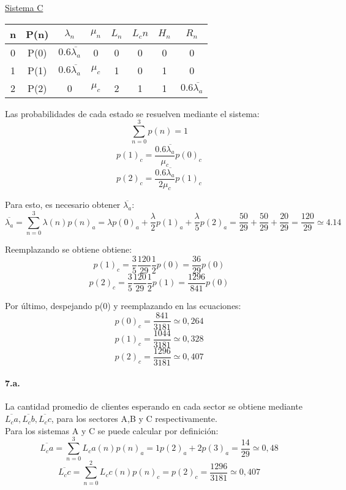 \documentclass{article}
\begin{document}
 \begin{center}
  \underline{Sistema C} \\ 
    \begin{tabular}{|| c | c | c | c | c | c | c | c ||}
    \hline 
     n & P(n) & $\lambda_n$ & $\mu_n$ & $L_n$& $L_cn$ & $H_n$ & $R_n$ 	\\ \hline \hline
     0 & P(0) & $0.6 \overline{\lambda_a}$ & 0       & 0    & 0      & 0     & 0	\\ \hline
     1 & P(1) & $0.6 \overline{\lambda_a}$ & $\mu_c$ & 1    & 0      & 1     & 0	\\ \hline
     2 & P(2) & 0               & $\mu_c$ & 2    & 1      & 1     & $0.6 \overline{\lambda_a}$ \\ \hline
     
    \end{tabular}
    
    Las probabilidades de cada estado se resuelven mediante el sistema: 
    $$ \sum_{n=0}^{3}p(n) = 1 $$
    $$ p(1)_c = \frac{0.6\overline{\lambda_a}}{\mu_c} p(0)_c$$
    $$ p(2)_c = \frac{0.6\overline{\lambda_a}}{2\mu_c} p(1)_c$$
    
    Para esto, es necesario obtener $\overline{\lambda_a}$: \\
    $$\overline{\lambda_a} = \sum_{n=0}^{3}\lambda(n) p(n)_a = \lambda p(0)_a + \frac{\lambda}{2} p(1)_a + \frac{\lambda}{5} p(2)_a = \frac{50}{29} + \frac{50}{29} + \frac{20}{29} = \frac{120}{29} \simeq 4.14$$
    
    Reemplazando se obtiene obtiene: 
    $$ p(1)_c = \frac{3}{5}\frac{120}{29}\frac{1}{2} p(0) = \frac{36}{29} p(0) $$
    $$ p(2)_c = \frac{3}{5}\frac{120}{29}\frac{1}{2} p(1) = \frac{1296}{841} p(0) $$
    
    Por último, despejando p(0) y reemplazando en las ecuaciones:
    $$ p(0)_c = \frac{841}{3181} \simeq 0,264 $$
    $$ p(1)_c = \frac{1044}{3181} \simeq 0,328 $$
    $$ p(2)_c = \frac{1296}{3181} \simeq 0,407 $$
  \end{center}
  
  \paragraph{7.a.} La cantidad promedio de clientes esperando en cada sector se obtiene mediante $\overline{L_ca}, \overline{L_cb},\overline{L_cc}$, para los sectores A,B y C respectivamente.\\
  Para los sistemas A y C se puede calcular por definición:
  $$\overline{L_ca} = \sum_{n=0}^{3}L_ca(n) p(n)_a = 1 p(2)_a + 2 p(3)_a = \frac{14}{29} \simeq 0,48 $$
  $$\overline{L_cc} = \sum_{n=0}^{2}L_cc(n) p(n)_c = p(2)_c = \frac{1296}{3181} \simeq 0,407  $$
  
\end{document}
